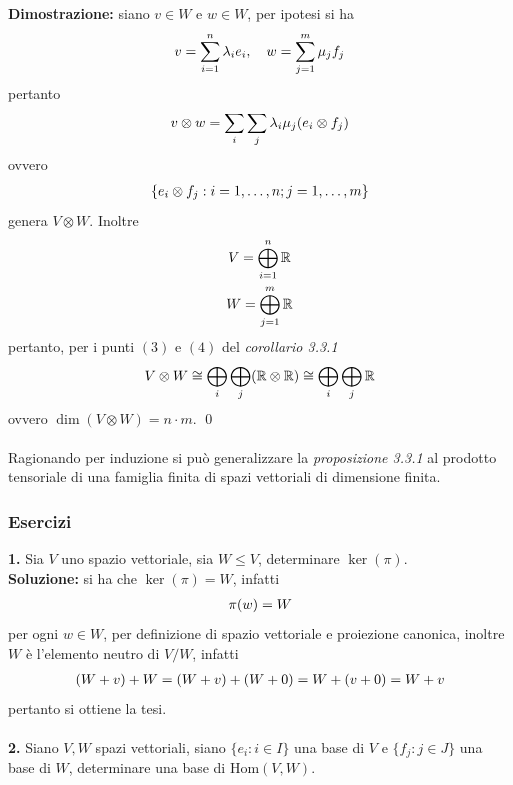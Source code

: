 \documentclass{article}
\begin{document}
\textbf{Dimostrazione:} siano $v \in W$ e $w \in W$, per ipotesi si ha
\begin{gather}
    v = \sum_{i = 1}^n \lambda_i e_i, \quad w = \sum_{j = 1}^m \mu_j f_j \notag
\end{gather}
pertanto
\begin{gather}
    v \otimes w = \sum_i \sum_j \lambda_i \mu_j  (e_i \otimes f_j) \notag
\end{gather}
ovvero
\begin{gather}
    \{ e_i \otimes f_j : i = 1, \dots, n; j = 1, \dots, m \} \notag
\end{gather}
genera $V \otimes W$. Inoltre
\begin{gather}
    V = \bigoplus_{i = 1}^n \mathbb{R} \notag \\
    W = \bigoplus_{j = 1}^m \mathbb{R} \notag
\end{gather}
pertanto, per i punti $(3)$ e $(4)$ del \textit{corollario 3.3.1}
\begin{gather}
    V \otimes W \cong \bigoplus_i \bigoplus_j (\mathbb{R} \otimes \mathbb{R}) \cong \bigoplus_i \bigoplus_j \mathbb{R} \notag
\end{gather}
ovvero $\dim (V \otimes W) = n \cdot m$. \qed \\ \\
Ragionando per induzione si può generalizzare la \textit{proposizione 3.3.1} al prodotto tensoriale di una famiglia finita di spazi vettoriali di dimensione finita.

\subsubsection{Esercizi}
\textbf{1.} Sia $V$ uno spazio vettoriale, sia $W \leq V$, determinare $\ker (\pi)$. \\

\textbf{Soluzione:} si ha che $\ker (\pi) = W$, infatti
\begin{gather}
    \pi(w) = W \notag
\end{gather}
per ogni $w \in W$, per definizione di spazio vettoriale e proiezione canonica, inoltre $W$ è l'elemento neutro di $V/W$, infatti
\begin{gather}
    (W + v) + W = (W + v) + (W + 0) = W + (v + 0) = W + v \notag
\end{gather}
pertanto si ottiene la tesi. \\ \\
\textbf{2.} Siano $V, W$ spazi vettoriali, siano $\{ e_i : i \in I \}$ una base di $V$ e $\{ f_j : j \in J \}$ una base di $W$, determinare una base di $\mathrm{Hom} (V, W)$. \\
\end{document}

